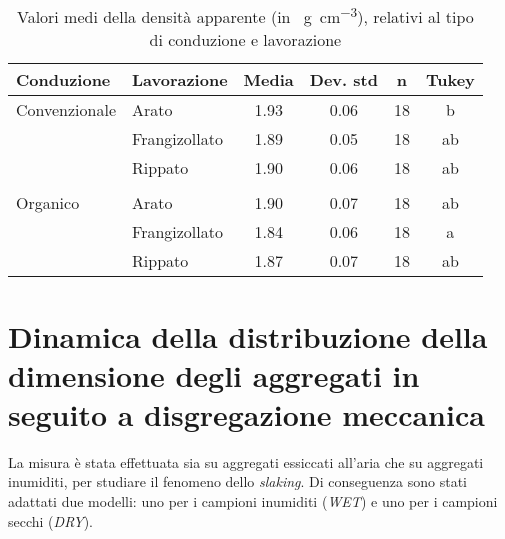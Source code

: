 \documentclass[a4paper]{article}
\begin{document}
\begin{table}[ht]
\centering
\caption{Valori medi della densità apparente (in
  \SI{}{\gram\per\cubic\centi\metre}), relativi al tipo di conduzione
  e lavorazione }
\label{tab:summaryClod}
\begin{tabular}{llcccc}
  \hline
Conduzione & Lavorazione & Media & Dev. std & n & Tukey \\ 
  \hline
Convenzionale & Arato & 1.93 & 0.06 &  18 & b \\ 
   & Frangizollato & 1.89 & 0.05 &  18 & ab \\ 
   & Rippato & 1.90 & 0.06 &  18 & ab \\ 
\\
  Organico & Arato & 1.90 & 0.07 &  18 & ab \\ 
   & Frangizollato & 1.84 & 0.06 &  18 & a \\ 
   & Rippato & 1.87 & 0.07 &  18 & ab \\ 
   \hline
\end{tabular}
\end{table}



\section{Dinamica della distribuzione della dimensione degli
  aggregati in seguito a disgregazione meccanica}

La misura \`e stata effettuata sia su aggregati essiccati all'aria che
su aggregati inumiditi, per studiare il fenomeno dello \emph{slaking}.
Di conseguenza sono stati adattati due modelli: uno per i campioni
inumiditi (\emph{WET}) e uno per i campioni secchi (\emph{DRY}).
\end{document}
